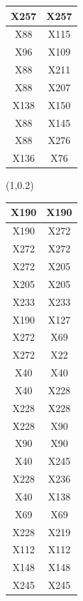 \documentclass{beamer}
\newcommand{\boz}{\cellcolor{pathwaynode}}
\newcommand{\ghool}{\cellcolor{independentnode}}
\begin{document}
\begin{frame}[plain]
\begin{textblock*}{\paperwidth}
\begin{tabular}{| c c |}
\ghool X257   &  \ghool X257  \\ \hline
\ghool X88   &  X115  \\ \hline
\ghool X96   &  X109  \\ \hline
\ghool X88   &  X211  \\ \hline
\ghool X88   &  X207  \\ \hline
\boz X138   &  X150  \\ \hline
\ghool X88   &  X145  \\ \hline
\ghool X88   &  X276  \\ \hline
\ghool X136   &  X76  \\ \hline
    \end{tabular}
    \hspace{.5em}
  \end{textblock*}
  \begin{textblock*}{\paperwidth}(1\textwidth,0.2\textheight)
    \raggedright 
    \tiny
    \begin{tabular}{| c c |}
      \hline
\boz X190   &  \boz X190  \\ \hline
\boz X190   &  \boz X272  \\ \hline
\boz X272   &  \boz X272  \\ \hline
\boz X272   &  X205  \\ \hline
X205   &  X205  \\ \hline
X233   &  X233  \\ \hline
\boz X190   &  X127  \\ \hline
\boz X272   &  X69  \\ \hline
\boz X272   &  \boz X22  \\ \hline
\boz X40   &  \boz X40  \\ \hline
\boz X40   &  \boz X228  \\ \hline
\boz X228   &  \boz X228  \\ \hline
\boz X228   &  X90  \\ \hline
X90   &  X90  \\ \hline
\boz X40   &  X245  \\ \hline
\boz X228   &  X236  \\ \hline
\boz X40   &  \boz X138  \\ \hline
X69   &  X69  \\ \hline
\boz X228   &  X219  \\ \hline
X112   &  X112  \\ \hline
\boz X148   &  \boz X148  \\ \hline
X245   &  X245  \\ \hline

\end{tabular}
\end{textblock*}
\end{frame}
\end{document}
